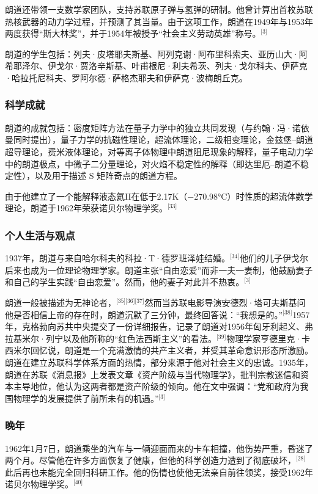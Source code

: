 朗道还带领一支数学家团队，支持苏联原子弹与氢弹的研制。他曾计算出首枚苏联热核武器的动力学过程，并预测了其当量。由于这项工作，朗道在1949年与1953年两度获得“斯大林奖”，并于1954年被授予“社会主义劳动英雄”称号。\(^\text{[3]}\)

朗道的学生包括：列夫·皮塔耶夫斯基、阿列克谢·阿布里科索夫、亚历山大·阿希耶泽尔、伊戈尔·贾洛辛斯基、叶甫根尼·利夫希茨、列夫·戈尔科夫、伊萨克·哈拉托尼科夫、罗阿尔德·萨格杰耶夫和伊萨克·波梅朗丘克。
\subsubsection{科学成就}
朗道的成就包括：密度矩阵方法在量子力学中的独立共同发现（与约翰·冯·诺依曼同时提出），量子力学的抗磁性理论，超流体理论，二级相变理论，金兹堡–朗道超导理论，费米液体理论，对等离子体物理中朗道阻尼现象的解释，量子电动力学中的朗道极点，中微子二分量理论，对火焰不稳定性的解释（即达里厄–朗道不稳定性），以及用于描述 S 矩阵奇点的朗道方程。

由于他建立了一个能解释液态氦II在低于2.17K（−270.98°C）时性质的超流体数学理论，朗道于1962年荣获诺贝尔物理学奖。\(^\text{[33]}\)
\subsubsection{个人生活与观点}
1937年，朗道与来自哈尔科夫的科拉·T·德罗班泽娃结婚。\(^\text{[34]}\)他们的儿子伊戈尔后来也成为一位理论物理学家。朗道主张“自由恋爱”而非一夫一妻制，他鼓励妻子和自己的学生实践“自由恋爱”。然而，他的妻子对此并不热衷。\(^\text{[3]}\)

朗道一般被描述为无神论者，\(^\text{[35][36][37]}\)然而当苏联电影导演安德烈·塔可夫斯基问他是否相信上帝的存在时，朗道沉默了三分钟，最终回答说：“我想是的。”\(^\text{[38]}\)1957年，克格勃向苏共中央提交了一份详细报告，记录了朗道对1956年匈牙利起义、弗拉基米尔·列宁以及他所称的“红色法西斯主义”的看法。\(^\text{[39]}\)物理学家亨德里克·卡西米尔回忆说，朗道是一个充满激情的共产主义者，并受其革命意识形态所激励。朗道在建立苏联科学体系方面的热情，部分来源于他对社会主义的忠诚。1935年，朗道在苏联《消息报》上发表文章《资产阶级与当代物理学》，批判宗教迷信和资本主导地位，他认为这两者都是资产阶级的倾向。他在文中强调：“党和政府为我国物理学的发展提供了前所未有的机遇。”\(^\text{[3]}\)
\subsubsection{晚年}
1962年1月7日，朗道乘坐的汽车与一辆迎面而来的卡车相撞，他伤势严重，昏迷了两个月。尽管他在许多方面恢复了健康，但他的科学创造力遭到了彻底破坏，\(^\text{[28]}\)此后再也未能完全回归科研工作。他的伤情也使他无法亲自前往领奖，接受1962年诺贝尔物理学奖。\(^\text{[40]}\)

